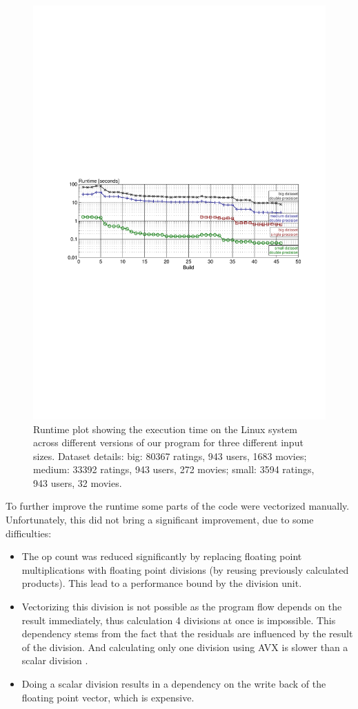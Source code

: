 \begin{figure}\centering
  \includegraphics[scale = 1, trim={7cm 11cm 6.4cm 14cm}]{graphics/runtime_plot.pdf}
  \caption{Runtime plot showing the execution time on the Linux system across different versions of our program for three different input sizes. Dataset details: big: 80367 ratings, 943 users, 1683 movies; medium: 33392 ratings, 943 users, 272 movies; small: 3594 ratings, 943 users, 32 movies.\label{runtime}}
\end{figure}

To further improve the runtime some parts of the code were vectorized manually. Unfortunately, this did not bring a significant improvement, due to some difficulties:
\begin{itemize}
	\item The op count was reduced significantly by replacing floating point multiplications with floating point divisions (by reusing previously calculated products). This lead to a performance bound by the division unit.
	\item Vectorizing this division is not possible as the program flow depends on the result immediately, thus calculation 4 divisions at once is impossible. This dependency stems from the fact that the residuals are influenced by the result of the division. And calculating only one division using AVX is slower than a scalar division \cite{intrinsics_guide}.
	\item Doing a scalar division results in a dependency on the write back of the floating point vector, which is expensive.
\end{itemize}
